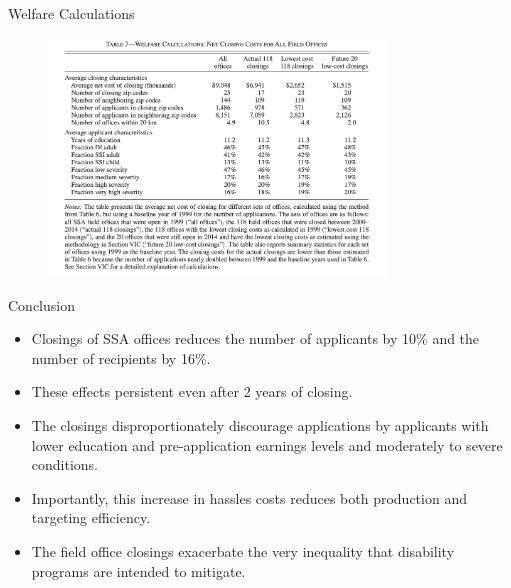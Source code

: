\documentclass{beamer}
\begin{document}
\begin{frame}{Welfare Calculations}
    \begin{figure}
        \centering
        \includegraphics[width=0.8\textwidth]{T7.png}
    \end{figure}
\end{frame}


\begin{frame}{Conclusion}
    \begin{itemize}
        \item Closings of SSA offices reduces the number of applicants by 10\% and the number of recipients by 16\%.
        \item These effects persistent even after 2 years of closing.
        \item The closings disproportionately discourage applications by applicants with lower education and pre-application earnings levels and moderately to severe conditions. 
        \item Importantly, this increase in hassles costs reduces both production and targeting efficiency.
        \item The field office closings exacerbate
        the very inequality that disability programs are intended to mitigate.
    \end{itemize}
\end{frame}
    
\end{document}
